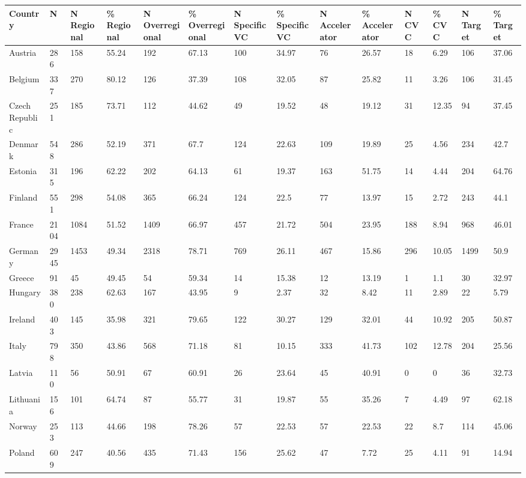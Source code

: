 \begin{tabular}{llllllllllllll}
  \toprule
Country & N & N Regional & \% Regional & N Overregional & \% Overregional & N Specific VC & \% Specific VC & N Accelerator & \% Accelerator & N CVC & \% CVC & N Target & \% Target \\ 
  \midrule
Austria & 286 & 158 & 55.24 & 192 & 67.13 & 100 & 34.97 & 76 & 26.57 & 18 & 6.29 & 106 & 37.06 \\ 
  Belgium & 337 & 270 & 80.12 & 126 & 37.39 & 108 & 32.05 & 87 & 25.82 & 11 & 3.26 & 106 & 31.45 \\ 
  Czech Republic & 251 & 185 & 73.71 & 112 & 44.62 & 49 & 19.52 & 48 & 19.12 & 31 & 12.35 & 94 & 37.45 \\ 
  Denmark & 548 & 286 & 52.19 & 371 & 67.7 & 124 & 22.63 & 109 & 19.89 & 25 & 4.56 & 234 & 42.7 \\ 
  Estonia & 315 & 196 & 62.22 & 202 & 64.13 & 61 & 19.37 & 163 & 51.75 & 14 & 4.44 & 204 & 64.76 \\ 
  Finland & 551 & 298 & 54.08 & 365 & 66.24 & 124 & 22.5 & 77 & 13.97 & 15 & 2.72 & 243 & 44.1 \\ 
  France & 2104 & 1084 & 51.52 & 1409 & 66.97 & 457 & 21.72 & 504 & 23.95 & 188 & 8.94 & 968 & 46.01 \\ 
  Germany & 2945 & 1453 & 49.34 & 2318 & 78.71 & 769 & 26.11 & 467 & 15.86 & 296 & 10.05 & 1499 & 50.9 \\ 
  Greece & 91 & 45 & 49.45 & 54 & 59.34 & 14 & 15.38 & 12 & 13.19 & 1 & 1.1 & 30 & 32.97 \\ 
  Hungary & 380 & 238 & 62.63 & 167 & 43.95 & 9 & 2.37 & 32 & 8.42 & 11 & 2.89 & 22 & 5.79 \\ 
  Ireland & 403 & 145 & 35.98 & 321 & 79.65 & 122 & 30.27 & 129 & 32.01 & 44 & 10.92 & 205 & 50.87 \\ 
  Italy & 798 & 350 & 43.86 & 568 & 71.18 & 81 & 10.15 & 333 & 41.73 & 102 & 12.78 & 204 & 25.56 \\ 
  Latvia & 110 & 56 & 50.91 & 67 & 60.91 & 26 & 23.64 & 45 & 40.91 & 0 & 0 & 36 & 32.73 \\ 
  Lithuania & 156 & 101 & 64.74 & 87 & 55.77 & 31 & 19.87 & 55 & 35.26 & 7 & 4.49 & 97 & 62.18 \\ 
  Norway & 253 & 113 & 44.66 & 198 & 78.26 & 57 & 22.53 & 57 & 22.53 & 22 & 8.7 & 114 & 45.06 \\ 
  Poland & 609 & 247 & 40.56 & 435 & 71.43 & 156 & 25.62 & 47 & 7.72 & 25 & 4.11 & 91 & 14.94 \\ 

\end{tabular}
